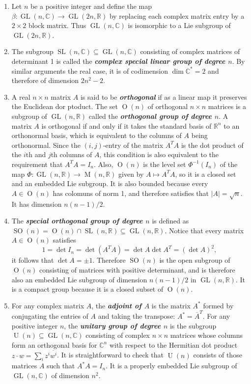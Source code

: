 \documentclass{article}
\numberwithin{equation}{section}
\newcommand{\R}{\mathbb{R}}
\newcommand{\C}{\mathbb{C}}
\renewcommand{\O}{\operatorname{O}}
\DeclareMathOperator{\GL}{GL}
\DeclareMathOperator{\SL}{SL}
\DeclareMathOperator{\SO}{SO}
\DeclareMathOperator{\U}{U}
\begin{document}
\begin{example}
\begin{enumerate}
		\item Let $n$ be a positive integer and define the map $\beta:\GL(n,\C)\to\GL(2n,\R)$ by replacing each complex matrix entry by a $2\times 2$ block matrix. Thus $\GL(n,\C)$ is isomorphic to a Lie subgroup of $\GL(2n,\R)$.
		\item The subgroup $\SL(n,\C)\subseteq\GL(n,\C)$ consisting of complex matrices of determinant 1 is called the \textbf{\textit{complex special linear group of degree $n$}}. By similar arguments the real case, it is of codimension $\dim\C^*=2$ and therefore of dimension $2n^2-2$.
		\item A real $n\times n$ matrix $A$ is said to be \textbf{\textit{orthogonal}} if as a linear map it preserves the Euclidean dor ptoduct. The set $\O(n)$ of orthogonal $n\times n$ matrices is a subgroup of $\GL(n,\R)$ called the \textbf{\textit{orthogonal group of degree $n$}}. A matrix $A$ is orthogonal if and only if it takes the standard basis of $\R^n$ to an orthonormal basis, which is equivalent to the columns of $A$ being orthonormal. Since the $(i,j)$-entry of the matrix $A^TA$ is the dot product of the $i$th and $j$th columns of $A$, this condition is also equivalent to the requirement that $A^TA=I_n$. Also, $\O(n)$ is the level set $\Phi^{-1}(I_n)$ of the map $\Phi:\GL(n,\R)\to\operatorname{M}(n,\R)$ given by $A\mapsto A^TA$, so it is a closed set and an embedded Lie subgroup. It is also bounded because every $A\in\O(n)$ has colomuns of norm 1, and therefore satisfies that $|A|=\sqrt{n}$. It has dimension $n(n-1)/2$.
		\item The \textbf{\textit{special orthogonal group of degree $n$}} is defined as $\SO(n)=\O(n)\cap\SL(n,\R)\subseteq\GL(n,\R)$. Notice that every matrix $A\in\O(n)$ satisfies
		\[1=\det I_n=\det(A^TA)=\det A\det A^T=(\det A)^2,\]
		it follows that $\det A=\pm1$. Therefore $\SO(n)$ is the open subgroup of $\O(n)$ consisting of matrices with positive determinant, and is therefore also an embedded Lie subgroup of dimension $n(n-1)/2$ in $\GL(n,\R)$. It is a compact group because it is a closed subset of $\O(n)$.
		\item For any complex matrix $A$, the \textbf{\textit{adjoint of $A$}} is the matrix $A^*$ formed by conjugating the entries of $A$ and taking the transpose: $A^*=\overline{A}^T$. For any positive integer $n$, the \textbf{\textit{unitary group of degree $n$}} is the subgroup $\U(n)\subseteq\GL(n,\C)$ consisting of complex $n\times n$ matrices whose columns form an orthogonal basis for $\C^n$ with respect to the Hermitian dot product $z\cdot w=\sum_iz^i\overline{w^i}$. It is straightforward to check that $\U(n)$ consists of those matrices $A$ such that $A^*A=I_n$. It is a properly embedded Lie subgroup of $\GL(n,\C)$ of dimension $n^2$.

\end{enumerate}
\end{example}
\end{document}

